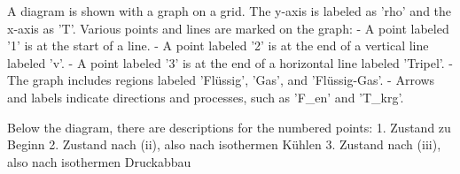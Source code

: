 A diagram is shown with a graph on a grid. The y-axis is labeled as 'rho' and the x-axis as 'T'. Various points and lines are marked on the graph: 
- A point labeled '1' is at the start of a line.
- A point labeled '2' is at the end of a vertical line labeled 'v'.
- A point labeled '3' is at the end of a horizontal line labeled 'Tripel'.
- The graph includes regions labeled 'Flüssig', 'Gas', and 'Flüssig-Gas'.
- Arrows and labels indicate directions and processes, such as 'F_en' and 'T_krg'.

Below the diagram, there are descriptions for the numbered points:
1. Zustand zu Beginn
2. Zustand nach (ii), also nach isothermen Kühlen
3. Zustand nach (iii), also nach isothermen Druckabbau